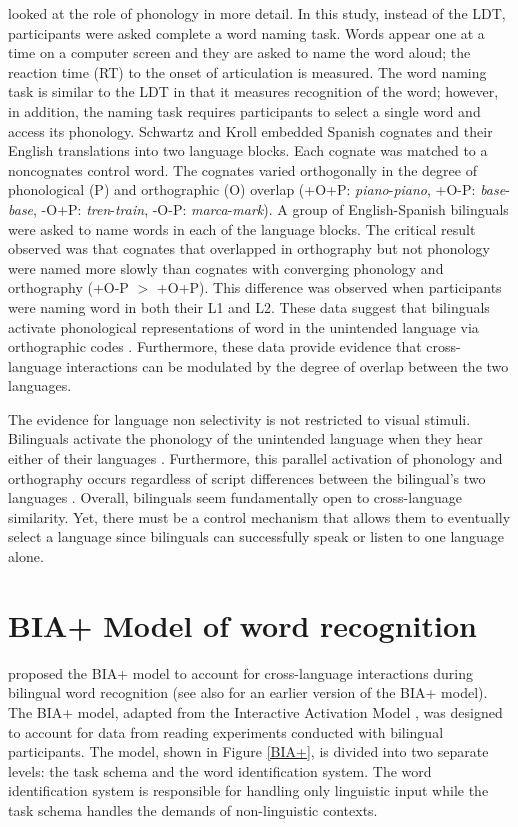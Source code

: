 \textcite{Schwartz2007} looked at the role of phonology in more detail. In this study, instead of the LDT, participants were asked complete a word naming task. Words appear one at a time on a computer screen and they are asked to name the word aloud; the reaction time (RT) to the onset of articulation is measured. The word naming task is similar to the LDT in that it measures recognition of the word; however, in addition, the naming task requires participants to select a single word and access its phonology. Schwartz and Kroll embedded Spanish cognates and their English translations into two language blocks. Each cognate was matched to a noncognates control word. The cognates varied orthogonally in the degree of phonological (P) and orthographic (O) overlap (+O+P: \textit{piano}-\textit{piano}, +O-P: \textit{base}-\textit{base}, -O+P: \textit{tren}-\textit{train}, -O-P: \textit{marca}-\textit{mark}). A group of English-Spanish bilinguals were asked to name words in each of the language blocks. The critical result observed was that cognates that overlapped in orthography but not phonology were named more slowly than cognates with converging phonology and orthography (+O-P $>$ +O+P). This difference was observed when participants were naming word in both their L1 and L2. These data suggest that bilinguals activate phonological representations of word in the unintended language via orthographic codes \parencite[see also][]{Jared2001}. Furthermore, these data provide evidence that cross-language interactions can be modulated by the degree of overlap between the two languages. 

The evidence for language non selectivity is not restricted to visual stimuli. Bilinguals activate the phonology of the unintended language when they hear either of their languages \parencite[e.g.,][]{Marian2003}. Furthermore, this parallel activation of phonology and orthography occurs regardless of script differences between the bilingual's two languages \parencite[e.g.,][]{Gollan1997}. Overall, bilinguals seem fundamentally open to cross-language similarity. Yet, there must be a control mechanism that allows them to eventually select a language since bilinguals can successfully speak or listen to one language alone. 

\section{BIA+ Model of word recognition}\label{Intro::BIA}
\textcite{Dijkstra2002} proposed the BIA+ model to account for cross-language interactions during bilingual word recognition (see also \textcite{Dijkstra1998} for an earlier version of the BIA+ model). The BIA+ model, adapted from the Interactive Activation Model \parencite{McClelland1981}, was designed to account for data from reading experiments conducted with bilingual participants. The model, shown in Figure \ref{BIA+}, is divided into two separate levels: the task schema and the word identification system. The word identification system is responsible for handling only linguistic input while the task schema handles the demands of non-linguistic contexts. 

